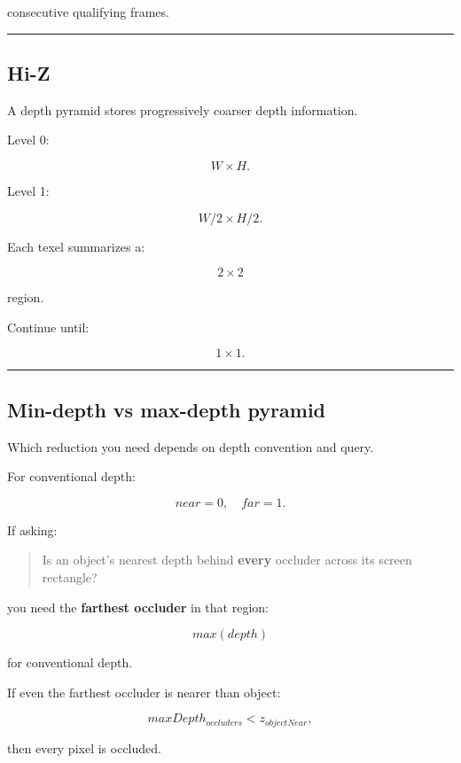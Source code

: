 consecutive qualifying frames.

\begin{center}\rule{0.5\linewidth}{0.5pt}\end{center}

\subsection{Hi-Z}\label{04-visual-computing-ii-ch040-hi-z}

A depth pyramid stores progressively coarser depth information.

Level 0:

\[
W\times H.
\]

Level 1:

\[
W/2\times H/2.
\]

Each texel summarizes a:

\[
2\times2
\]

region.

Continue until:

\[
1\times1.
\]

\begin{center}\rule{0.5\linewidth}{0.5pt}\end{center}

\subsection{Min-depth vs max-depth pyramid}\label{04-visual-computing-ii-ch040-min-depth-vs-max-depth-pyramid}

Which reduction you need depends on depth convention and query.

For conventional depth:

\[
near=0,\quad far=1.
\]

If asking:

\begin{quote}
Is an object's nearest depth behind \textbf{every} occluder across its screen rectangle?
\end{quote}

you need the \textbf{farthest occluder} in that region:

\[
\boxed{
max(depth)
}
\]

for conventional depth.

If even the farthest occluder is nearer than object:

\[
maxDepth_{occluders}
<
z_{objectNear},
\]

then every pixel is occluded.

